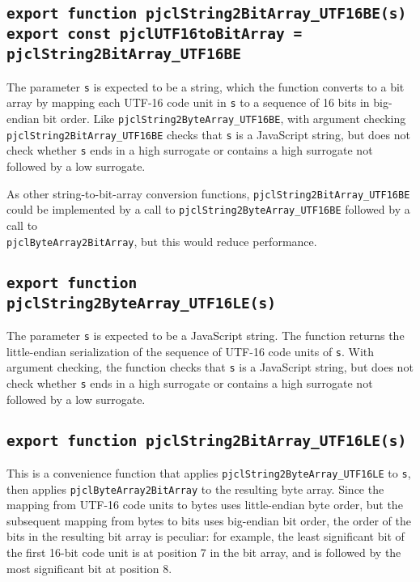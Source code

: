\documentclass[12pt]{article}
\begin{document}
\subsection{\tt export function pjclString2BitArray\_UTF16BE(s)\\export const pjclUTF16toBitArray = pjclString2BitArray\_UTF16BE}

The parameter {\tt s} is expected to be a string, which the
function converts to a bit array by mapping each UTF-16 code unit in
{\tt s} to a sequence of 16 bits in big-endian bit order.  Like 
{\tt pjclString2ByteArray\_UTF16BE}, with argument checking
{\tt pjclString2BitArray\_UTF16BE}
checks that {\tt s} is a JavaScript string, but does not check whether {\tt s} ends
in a high surrogate or contains a high surrogate not followed by a low
surrogate.

As other string-to-bit-array conversion functions, {\tt pjclString2BitArray\_UTF16BE}
could be implemented by a call to {\tt pjclString2ByteArray\_UTF16BE}
followed by a call to\\
{\tt pjclByteArray2BitArray}, but this would reduce performance.

\subsection{\tt export function pjclString2ByteArray\_UTF16LE(s)}

The parameter {\tt s} is expected to be a JavaScript string.  
The function returns the little-endian serialization of the sequence of
UTF-16 code units of {\tt s}.  With argument checking, the function
checks that {\tt s} is a JavaScript string, but does not check whether {\tt s} ends
in a high surrogate or contains a high surrogate not followed by a low
surrogate.

\subsection{\tt export function pjclString2BitArray\_UTF16LE(s)}

This is a convenience function that applies {\tt pjclString2ByteArray\_UTF16LE} to {\tt s},
then applies {\tt pjclByteArray2BitArray} to the resulting byte array.  Since the mapping
from UTF-16 code units to bytes uses little-endian byte order, but the subsequent
mapping from bytes to bits uses big-endian bit order, the order of the bits in the 
resulting bit array is peculiar: for example, the least significant bit of the first 
16-bit code unit is at position 7 in the bit array, and is followed by the most significant
bit at position 8.
\end{document}
